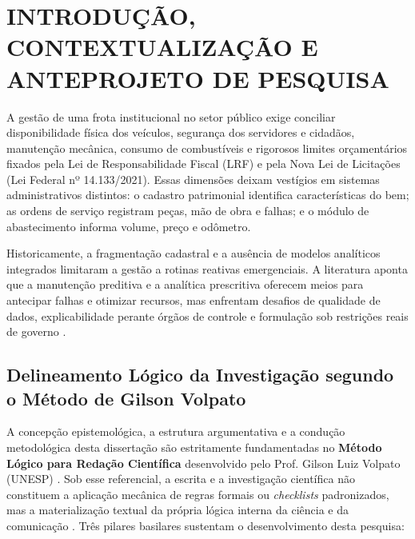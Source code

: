 \chapter{INTRODUÇÃO, CONTEXTUALIZAÇÃO E ANTEPROJETO DE PESQUISA}
\label{cap:introducao}

A gestão de uma frota institucional no setor público exige conciliar disponibilidade física dos veículos, segurança dos servidores e cidadãos, manutenção mecânica, consumo de combustíveis e rigorosos limites orçamentários fixados pela Lei de Responsabilidade Fiscal (LRF) e pela Nova Lei de Licitações (Lei Federal nº 14.133/2021). Essas dimensões deixam vestígios em sistemas administrativos distintos: o cadastro patrimonial identifica características do bem; as ordens de serviço registram peças, mão de obra e falhas; e o módulo de abastecimento informa volume, preço e odômetro.

Historicamente, a fragmentação cadastral e a ausência de modelos analíticos integrados limitaram a gestão a rotinas reativas emergenciais. A literatura aponta que a manutenção preditiva e a analítica prescritiva oferecem meios para antecipar falhas e otimizar recursos, mas enfrentam desafios de qualidade de dados, explicabilidade perante órgãos de controle e formulação sob restrições reais de governo \cite{mahale2025}.

\section{Delineamento Lógico da Investigação segundo o Método de Gilson Volpato}
\label{sec:metodo_volpato_intro}

A concepção epistemológica, a estrutura argumentativa e a condução metodológica desta dissertação são estritamente fundamentadas no \textbf{Método Lógico para Redação Científica} desenvolvido pelo Prof. Gilson Luiz Volpato (UNESP) \cite{volpato2015,volpato2017}. Sob esse referencial, a escrita e a investigação científica não constituem a aplicação mecânica de regras formais ou \textit{checklists} padronizados, mas a materialização textual da própria lógica interna da ciência e da comunicação \cite{volpato2015}. Três pilares basilares sustentam o desenvolvimento desta pesquisa:

